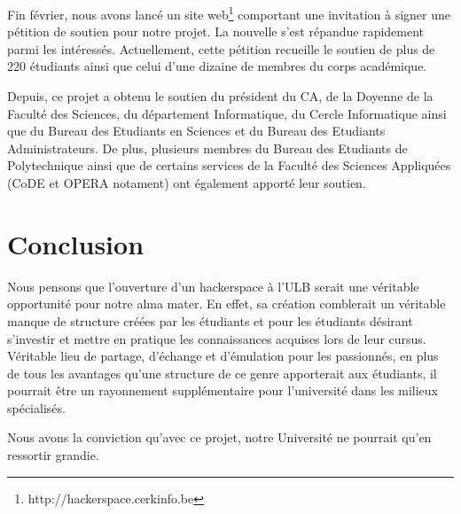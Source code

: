 \documentclass{article}
\begin{document}
Fin février, nous avons lancé un site web\footnote{http://hackerspace.cerkinfo.be} comportant
une invitation à signer une pétition de soutien pour notre projet. La nouvelle s'est répandue rapidement parmi les intéressés. Actuellement, cette pétition recueille le soutien de plus de 220 étudiants ainsi que celui d'une dizaine de membres du corps académique.

Depuis, ce projet a obtenu le soutien du président du CA, de la Doyenne de la Faculté des Sciences, du département Informatique, du 
Cercle Informatique ainsi que du Bureau des Etudiants en Sciences et du Bureau des Etudiants Administrateurs.
De plus, plusieurs membres du Bureau des Etudiants de Polytechnique ainsi que de certains services de la Faculté
des Sciences Appliquées (CoDE et OPERA notament) ont également apporté leur soutien.

\section{Conclusion}
Nous pensons que l'ouverture d'un hackerspace à l'ULB serait une véritable opportunité pour notre alma mater. En effet, sa création comblerait un véritable manque de structure créées par les étudiants et pour les étudiants désirant s'investir et mettre en pratique les connaissances acquises lors de leur cursus. Véritable lieu de partage, d'échange et d'émulation pour les passionnés, en plus de tous les avantages qu'une structure de ce genre apporterait aux étudiants, il pourrait être un rayonnement supplémentaire pour l'université dans les milieux spécialisés.

Nous avons la conviction qu'avec ce projet, notre Université ne pourrait qu'en ressortir grandie.
\end{document}
